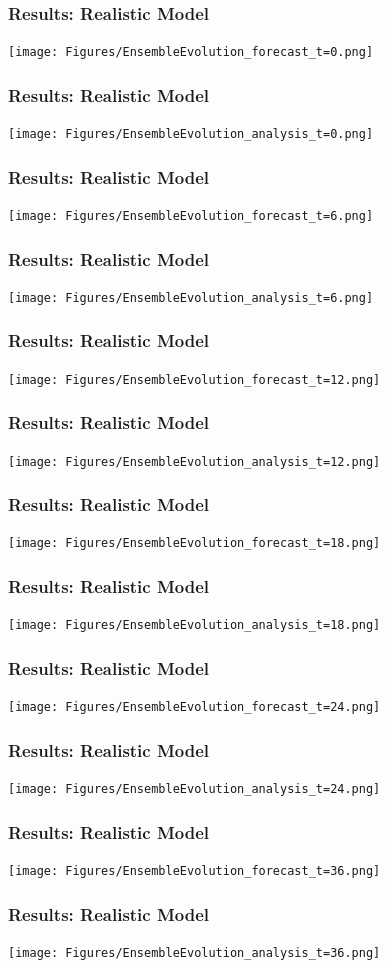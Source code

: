 \documentclass{beamer}
\begin{document}
\begin{frame}
\frametitle{Results: Realistic Model}
\centering
\texttt{[image: Figures/EnsembleEvolution\_forecast\_t=0.png]}
\end{frame}
\begin{frame}
\frametitle{Results: Realistic Model}
\centering
\texttt{[image: Figures/EnsembleEvolution\_analysis\_t=0.png]}
\end{frame}
\begin{frame}
\frametitle{Results: Realistic Model}
\centering
\texttt{[image: Figures/EnsembleEvolution\_forecast\_t=6.png]}
\end{frame}
\begin{frame}
\frametitle{Results: Realistic Model}
\centering
\texttt{[image: Figures/EnsembleEvolution\_analysis\_t=6.png]}
\end{frame}
\begin{frame}
\frametitle{Results: Realistic Model}
\centering
\texttt{[image: Figures/EnsembleEvolution\_forecast\_t=12.png]}
\end{frame}
\begin{frame}
\frametitle{Results: Realistic Model}
\centering
\texttt{[image: Figures/EnsembleEvolution\_analysis\_t=12.png]}
\end{frame}
\begin{frame}
\frametitle{Results: Realistic Model}
\centering
\texttt{[image: Figures/EnsembleEvolution\_forecast\_t=18.png]}
\end{frame}
\begin{frame}
\frametitle{Results: Realistic Model}
\centering
\texttt{[image: Figures/EnsembleEvolution\_analysis\_t=18.png]}
\end{frame}
\begin{frame}
\frametitle{Results: Realistic Model}
\centering
\texttt{[image: Figures/EnsembleEvolution\_forecast\_t=24.png]}
\end{frame}
\begin{frame}
\frametitle{Results: Realistic Model}
\centering
\texttt{[image: Figures/EnsembleEvolution\_analysis\_t=24.png]}
\end{frame}
\begin{frame}
\frametitle{Results: Realistic Model}
\centering
\texttt{[image: Figures/EnsembleEvolution\_forecast\_t=36.png]}
\end{frame}
\begin{frame}
\frametitle{Results: Realistic Model}
\centering
\texttt{[image: Figures/EnsembleEvolution\_analysis\_t=36.png]}
\end{frame}
\end{document}
